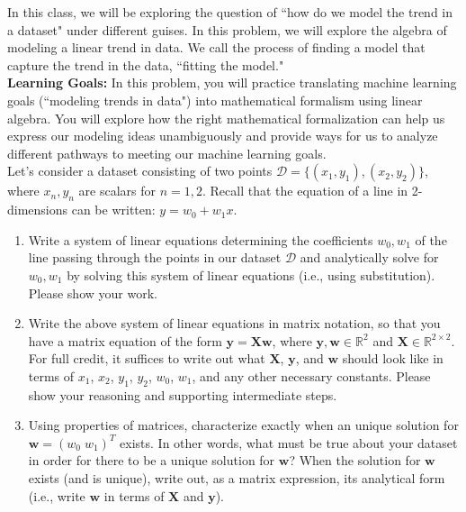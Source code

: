 \documentclass{harvardml}
\theoremstyle{definition}
\theoremstyle{plain}
\begin{document}
\newpage
\begin{problem}
In this class, we will be exploring the question of ``how do we model the trend in a dataset" under different guises. In this problem, we will explore the algebra of modeling a linear trend in data. We call the process of finding a model that capture the trend in the data, ``fitting the model."\\

\noindent \textbf{Learning Goals:} In this problem, you will practice translating machine learning goals (``modeling trends in data") into mathematical formalism using linear algebra. You will explore how the right mathematical formalization can help us express our modeling ideas unambiguously and provide ways for us to analyze different pathways to meeting our machine learning goals.\\

\noindent Let's consider a dataset consisting of two points $\mathcal{D} = \{(x_1, y_1), (x_2, y_2)\}$, where $x_n, y_n$ are scalars for $n=1, 2$. Recall that the equation of a line in 2-dimensions can be written: $y = w_0 + w_1x$. 
\begin{enumerate}
    \item Write a system of linear equations determining the coefficients $w_0, w_1$ of the line passing through the points in our dataset $\mathcal{D}$ and analytically solve for $w_0, w_1$ by solving this system of linear equations (i.e., using substitution). Please show your work.
    \item Write the above system of linear equations in matrix notation, so that you have a matrix equation of the form $\mathbf{y} = \mathbf{X}\mathbf{w}$, where $\mathbf{y}, \mathbf{w} \in \mathbb{R}^2$ and $\mathbf{X} \in \mathbb{R}^{2\times 2}$. For full credit, it suffices to write out what $\mathbf{X}$, $\mathbf{y}$, and $\mathbf{w}$ should look like in terms of $x_1$, $x_2$, $y_1$, $y_2$, $w_0$, $w_1$, and any other necessary constants. Please show your reasoning and supporting intermediate steps.
    \item Using properties of matrices, characterize exactly when an unique solution for  $\mathbf{w}=\left(w_0 \; w_1 \right)^{T}$ exists. In other words, what must be true about your dataset in order for there to be a unique solution for $\mathbf{w}$? When the solution for $\mathbf{w}$ exists (and is unique), write out, as a matrix expression, its analytical form (i.e., write $\mathbf{w}$ in terms of $\mathbf{X}$ and $\mathbf{y}$).
    

\end{enumerate}
\end{problem}
\end{document}
